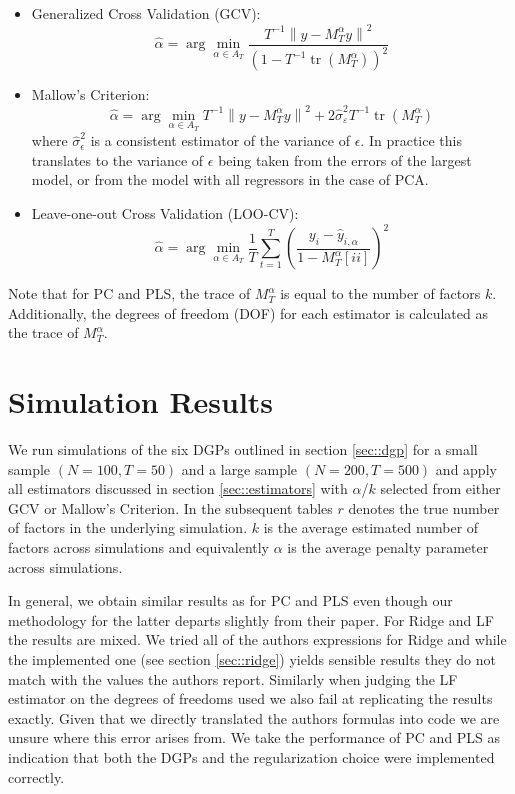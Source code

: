 \begin{itemize}
	\item Generalized Cross Validation (GCV): \\
\[\hat{\alpha}=\arg \min _{\alpha \in A_{T}} \frac{T^{-1}\left\|y-M_{T}^{\alpha} y\right\|^{2}}{\left(1-T^{-1} \operatorname{tr}\left(M_{T}^{\alpha}\right)\right)^{2}}\]

	\item Mallow's Criterion: \\
\[\hat{\alpha}=\arg \min _{\alpha \in A_{T}} T^{-1}\left\|y-M_{T}^{\alpha} y\right\|^{2}+2 \widehat{\sigma}_{\varepsilon}^{2} T^{-1} \operatorname{tr}\left(M_{T}^{\alpha}\right)\]
where $\widehat{\sigma}_{\epsilon}^{2}$ is a consistent estimator of the variance of $\epsilon$. In practice this translates to the variance of $\epsilon$ being taken from the errors of the largest model, or from the model with all regressors in the case of PCA.

	\item Leave-one-out Cross Validation (LOO-CV): \\
\[\hat{\alpha}=\arg \min _{\alpha \in A_{T}} \frac{1}{T} \sum_{t=1}^{T}\left(\frac{y_{i}-\hat{y}_{i, \alpha}}{1-M_{T}^{\alpha}[ii]}\right)^{2}\]

\end{itemize}

Note that for PC and PLS, the trace of $M_{T}^{\alpha}$ is equal to the number of factors $k$. Additionally, the degrees of freedom (DOF) for each estimator is calculated as the trace of $M_{T}^{\alpha}$. 

\section{Simulation Results}

We run simulations of the six DGPs outlined in section \ref{sec::dgp} for a small sample $(N = 100, T = 50)$ and a large sample $(N=200, T=500)$ and apply all estimators discussed in section \ref{sec::estimators} with $\alpha$/$k$ selected from either GCV or Mallow's Criterion. In the subsequent tables $r$ denotes the true number of factors in the underlying simulation. $k$ is the average estimated number of factors across simulations and equivalently $\alpha$ is the average penalty parameter across simulations.




In general, we obtain similar results as \citeauthor{carrasco2016sample} for PC and PLS even though our methodology for the latter departs slightly from their paper. For Ridge and LF the results are mixed. We tried all of the authors expressions for Ridge and while the implemented one (see section \ref{sec::ridge}) yields sensible results they do not match with the values the authors report. Similarly when judging the LF estimator on the degrees of freedoms used we also fail at replicating the results exactly. Given that we directly translated the authors formulas into code we are unsure where this error arises from. We take the performance of PC and PLS as indication that both the DGPs and the regularization choice were implemented correctly. 

